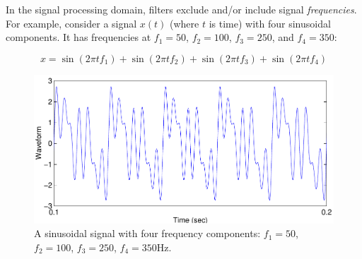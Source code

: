 In the signal processing domain, filters exclude and/or include signal
\emph{frequencies}. For example, consider a signal $x(t)$ (where $t$
is time) with four sinusoidal components. It has frequencies at
$f_1=50$, $f_2=100$, $f_3=250$, and $f_4=350$:

\begin{equation}
x=\sin(2\pi t f_1)+\sin(2\pi t f_2)+\sin(2\pi t f_3)+\sin(2\pi t f_4)
\label{eq:sine4}
\end{equation} 


\begin{figure}
\centerline{\includegraphics[width=5in]{ch-fir/sine4}}
\caption[Four frequency components]{A sinusoidal signal with four
frequency components: $f_1=50$, $f_2=100$, $f_3=250$,
$f_4=350$Hz.\label{fig:sine4}}
\end{figure}

